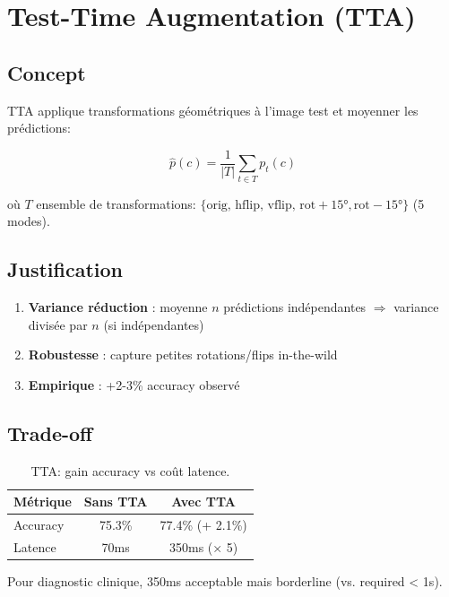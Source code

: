 \documentclass[12pt,a4paper,oneside]{report}
\begin{document}
\section{Test-Time Augmentation (TTA)}

\subsection{Concept}

TTA applique transformations géométriques à l'image test et moyenner 
les prédictions:

\begin{equation}
\hat{p}(c) = \frac{1}{|T|} \sum_{t \in T} p_t(c)
\label{eq:tta}
\end{equation}

où $T$ ensemble de transformations: $\{ \text{orig, hflip, vflip, 
rot}+15°, \text{rot}-15° \}$ (5 modes).

\subsection{Justification}

\begin{enumerate}
    \item \textbf{Variance réduction} : moyenne $n$ prédictions indépendantes 
          $\Rightarrow$ variance divisée par $n$ (si indépendantes)
    \item \textbf{Robustesse} : capture petites rotations/flips 
          in-the-wild
    \item \textbf{Empirique} : +2-3\% accuracy observé
\end{enumerate}

\subsection{Trade-off}

\begin{table}[H]
\centering
\begin{tabular}{|l|c|c|}
\hline
Métrique & Sans TTA & Avec TTA \\
\hline
Accuracy & 75.3\% & 77.4\% (+ 2.1\%) \\
Latence & 70ms & 350ms (× 5) \\
\hline
\end{tabular}
\caption{TTA: gain accuracy vs coût latence.}
\label{tab:tta_tradeoff}
\end{table}

Pour diagnostic clinique, 350ms acceptable mais borderline 
(vs. required < 1s).
\end{document}
